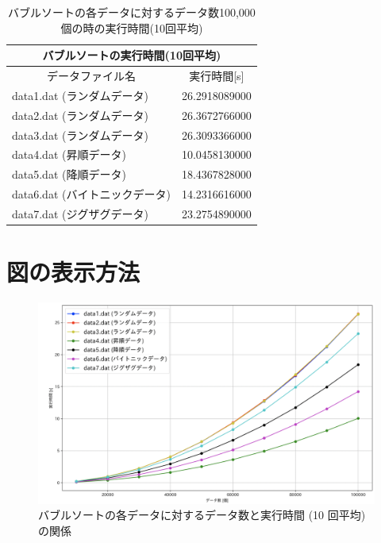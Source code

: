 \documentclass[a4j, titlepage]{jarticle}
\begin{document}
  \begin{table}[htb]
    \caption{バブルソートの各データに対するデータ数100,000個の時の実行時間(10回平均)}
    \label{table:bubble}
    \begin{center}
      \begin{tabular}{|l|c|}
        \hline
        \multicolumn{2}{|c|}{バブルソートの実行時間(10回平均)}\\
        \hline
        \hline
        \multicolumn{1}{|c|}{データファイル名} & 実行時間[s]\\
        \hline
        data1.dat (ランダムデータ) & 26.2918089000\\
        \hline
        data2.dat (ランダムデータ) & 26.3672766000\\
        \hline
        data3.dat (ランダムデータ) & 26.3093366000\\
        \hline
        data4.dat (昇順データ) & 10.0458130000\\
        \hline
        data5.dat (降順データ) & 18.4367828000\\
        \hline
        data6.dat (バイトニックデータ) & 14.2316616000\\
        \hline
        data7.dat (ジグザグデータ) & 23.2754890000\\   
        \hline
      \end{tabular}
    \end{center}
  \end{table}

  \clearpage
  

  \section{図の表示方法}

  \begin{figure}[htb]
    \begin{center}
      \includegraphics[scale=0.3]{bubble.png}
      \caption{バブルソートの各データに対するデータ数と実行時間 (10 回平均) の関係}
      \label{graph:bubble}
    \end{center}
  \end{figure}
\end{document}
